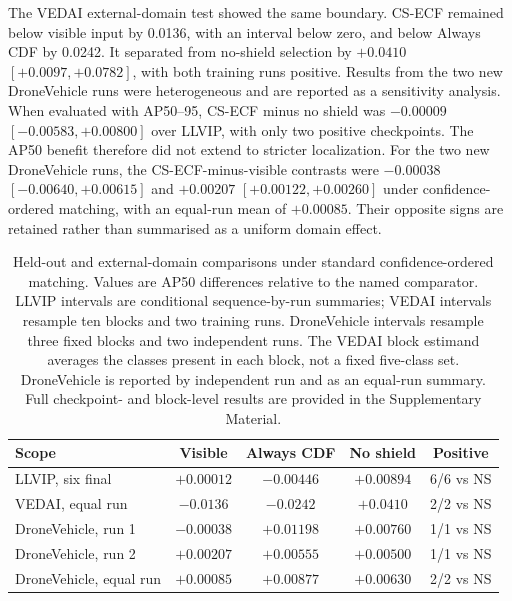 The VEDAI external-domain test showed the same boundary. CS-ECF remained below
visible input by 0.0136, with an interval below zero, and below Always CDF by
0.0242. It separated from no-shield selection by \(+0.0410\)
\([+0.0097,+0.0782]\), with both training runs positive. Results from the two
new DroneVehicle runs were heterogeneous and are reported as a sensitivity
analysis. When evaluated with AP50--95, CS-ECF minus no shield was \(-0.00009\)
\([-0.00583,+0.00800]\) over LLVIP, with only two positive checkpoints. The
AP50 benefit therefore did not extend to stricter localization. For the two
new DroneVehicle runs, the CS-ECF-minus-visible contrasts were \(-0.00038\)
\([-0.00640,+0.00615]\) and \(+0.00207\) \([+0.00122,+0.00260]\) under
confidence-ordered matching, with an equal-run mean of \(+0.00085\). Their
opposite signs are retained rather than summarised as a uniform domain effect.

\begin{table}[t]
\centering
\small
\setlength{\tabcolsep}{3pt}
\caption{Held-out and external-domain comparisons under standard
confidence-ordered matching. Values are AP50 differences relative to the named
comparator. LLVIP intervals are conditional sequence-by-run summaries; VEDAI
intervals resample ten blocks and two training runs. DroneVehicle intervals
resample three fixed blocks and two independent runs. The VEDAI block
estimand averages the classes present in each block, not a fixed five-class
set. DroneVehicle is reported by independent run and as an equal-run summary.
Full checkpoint- and block-level results are provided in the Supplementary
Material.}
\label{tab:main-comparison}
\begin{tabular}{@{}lcccc@{}}
\toprule
Scope & Visible & Always CDF & No shield & Positive \\
\midrule
LLVIP, six final & \(+0.00012\) & \(-0.00446\) & \(+0.00894\) & 6/6 vs NS \\
VEDAI, equal run & \(-0.0136\) & \(-0.0242\) & \(+0.0410\) & 2/2 vs NS \\
DroneVehicle, run 1 & \(-0.00038\) & \(+0.01198\) & \(+0.00760\) &
1/1 vs NS \\
DroneVehicle, run 2 & \(+0.00207\) & \(+0.00555\) & \(+0.00500\) &
1/1 vs NS \\
DroneVehicle, equal run & \(+0.00085\) & \(+0.00877\) & \(+0.00630\) &
2/2 vs NS \\
\bottomrule
\end{tabular}
\end{table}

